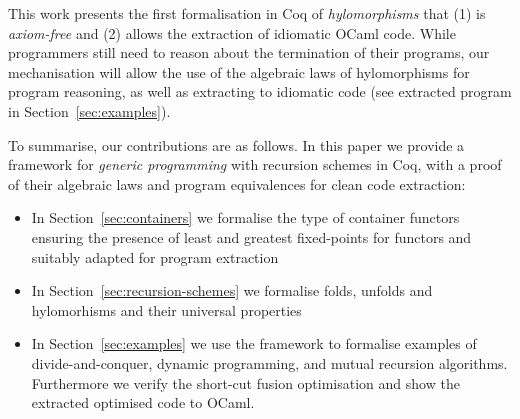 \documentclass[ a4paper, UKenglish, cleveref, autoref, thm-restate]{lipics-v2021}
\newcommand{\cata}[1]{\lbans #1 \rbans}
\newcommand{\ana}[1]{\llens #1 \rlens}
\newcommand{\comp}{\cdot}
\newcommand{\operator}[1]{\textsf{#1}}
\newcommand{\InOp}{\operator{in}^{\circ}}
\newcommand{\OutOp}{\operator{out}^{\circ}}
\begin{document}
This work presents the first formalisation in Coq of \emph{hylomorphisms} that (1) is \emph{axiom-free} and (2) allows the
extraction of idiomatic OCaml code. While programmers still need to reason about
the termination of their programs, our mechanisation will allow the use of the
algebraic laws of hylomorphisms for program reasoning, as well as extracting to
idiomatic code (see extracted  program in Section~\ref{sec:examples}). %

To summarise, our contributions are as follows. In this paper we provide a
framework for \emph{generic programming} with recursion schemes in Coq, with a
proof of their algebraic laws and program equivalences for clean code
extraction:
\begin{itemize}
  \item In Section~\ref{sec:containers} we formalise the type of container functors ensuring the presence of least and greatest fixed-points for functors and suitably adapted for program extraction
  \item In Section~\ref{sec:recursion-schemes} we formalise folds, unfolds and hylomorhisms and their universal properties
  \item In Section~\ref{sec:examples} we use the framework to formalise examples of divide-and-conquer, dynamic programming, and mutual recursion algorithms. Furthermore we verify the short-cut fusion optimisation and show the extracted optimised code to OCaml.
\end{itemize}

\end{document}
